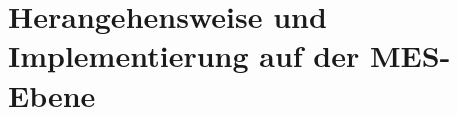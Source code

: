 \section{Herangehensweise und Implementierung auf der MES-Ebene}
\label{ch_06Herangehensweise und Implementierung auf der MES-Ebene}
